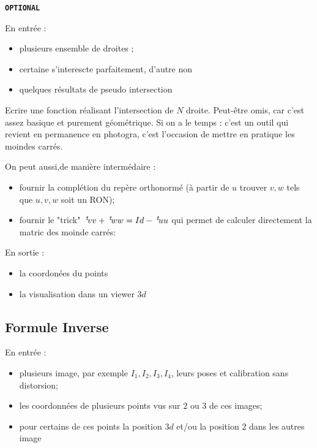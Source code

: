 {\tt \bf OPTIONAL}

En entrée :

\begin{itemize}
   \item plusieurs ensemble de droites ;
   \item certaine s'interescte parfaitement, d'autre non
   \item quelques résultats de pseudo intersection
\end{itemize}

Ecrire une fonction réalisant l'intersection de $N$ droite. Peut-être omis, car c'est assez
basique et purement géométrique. Si on a le temps : c'est un outil qui revient en permanence
en photogra, c'est l'occasion de mettre en pratique les moindes carrés.  

On peut aussi,de manière intermédaire :

\begin{itemize}
	\item fournir la complétion du repère orthonormé  (à partir de $u$ trouver $v,w$ tels que $u,v,w$ soit un RON);
	\item fournir le "trick" $\; ^{t} \! v v + \; ^{t} \! w w = Id - \; ^{t} \! u u$ qui permet de calculer directement la matric
		des moinde carrés:
\end{itemize}

En sortie :

\begin{itemize}
   \item la coordonées du points 
   \item la visualisation dans un viewer $3d$ 
\end{itemize}


\subsection{Formule Inverse}
\label{TutoFormIWoD}

En entrée :

\begin{itemize}
   \item plusieurs image, par exemple $I_1,I_2,I_3,I_4$, leurs poses et calibration sans distorsion;
   \item les coordonnées de plusieurs points vus sur $2$ ou $3$ de ces images;
   \item pour certains de ces points la position $3d$ et/ou la position $2$ dans les autres image
\end{itemize}

